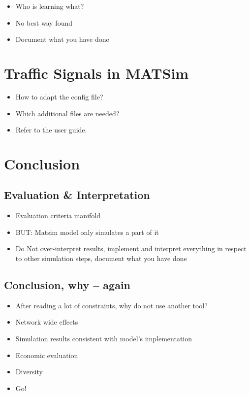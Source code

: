\begin{itemize}
	\item Who is learning what? 
	\item No best way found
	\item Document what you have done
\end{itemize}


\section{Traffic Signals in MATSim}
\label{sec:signals_traffic_signals_in_matsim}

\begin{itemize}
	\item How to adapt the config file?
	\item Which additional files are needed?
	\item Refer to the user guide.
\end{itemize}


\section{Conclusion}
\label{sec:signals_conclusion}

\subsection{Evaluation \& Interpretation}

\begin{itemize}
	\item Evaluation criteria manifold
	\item BUT: Matsim model only simulates a part of it
	\item Do Not over-interpret results, implement and interpret everything in respect to other simulation steps, document what you have done
\end{itemize}


\subsection{Conclusion, why -- again}

\begin{itemize}
	\item After reading a lot of constraints, why do not use another tool?
	\item Network wide effects
	\item Simulation results consistent with model's implementation 
	\item Economic evaluation
	\item Diversity 
	\item Go!
\end{itemize}


